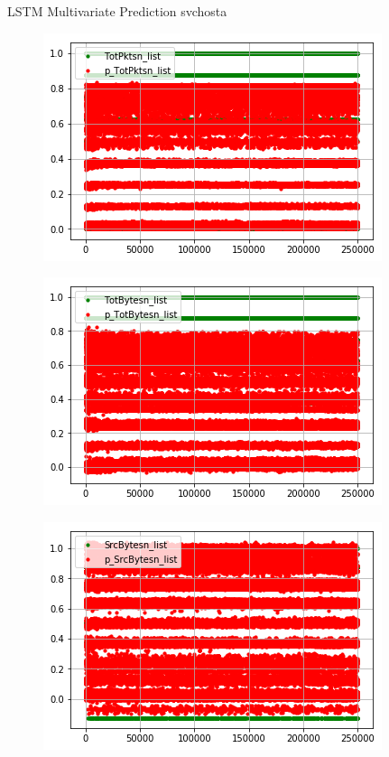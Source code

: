 \documentclass[t]{beamer}
\begin{document}
\begin{frame}{LSTM Multivariate Prediction svchosta}
\begin{subfigure}[b]{0.3\linewidth}
    \end{subfigure}
    \begin{subfigure}[b]{0.3\linewidth}
        \includegraphics[width=\textwidth]{public/assets/img/lstmm_svchosta_pred7.png}
    \end{subfigure}
    \begin{subfigure}[b]{0.3\linewidth}
        \includegraphics[width=\textwidth]{public/assets/img/lstmm_svchosta_pred8.png}
    \end{subfigure}
    \begin{subfigure}[b]{0.3\linewidth}
        \includegraphics[width=\textwidth]{public/assets/img/lstmm_svchosta_pred9.png}

\end{subfigure}
\end{frame}
\end{document}
